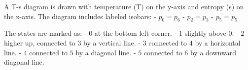 A T-s diagram is drawn with temperature (T) on the y-axis and entropy (s) on the x-axis. The diagram includes labeled isobars:  
- \( p_0 = p_6 \)  
- \( p_2 = p_3 \)  
- \( p_5 = p_5 \)  

The states are marked as:  
- \( 0 \) at the bottom left corner.  
- \( 1 \) slightly above \( 0 \).  
- \( 2 \) higher up, connected to \( 3 \) by a vertical line.  
- \( 3 \) connected to \( 4 \) by a horizontal line.  
- \( 4 \) connected to \( 5 \) by a diagonal line.  
- \( 5 \) connected to \( 6 \) by a downward diagonal line.